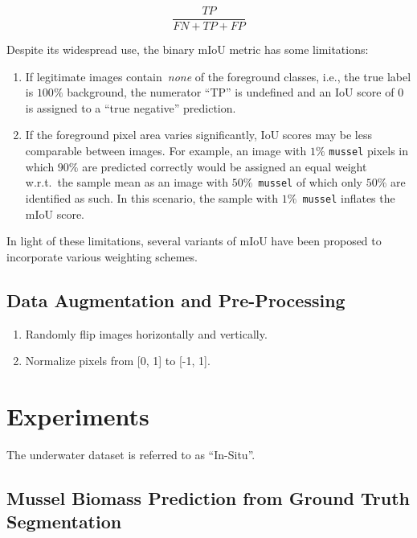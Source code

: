 \documentclass[11pt]{article} %
\begin{document}
\begin{equation}
\frac{TP}{FN + TP + FP}
\end{equation}

Despite its widespread use, the binary mIoU metric has some limitations:

\begin{enumerate}
\item If legitimate images contain~\emph{none} of the foreground classes, i.e.,
the true label is $100\%$ background, the numerator ``TP'' is undefined and an
IoU score of 0 is assigned to a ``true negative'' prediction.

\item If the foreground pixel area varies significantly, IoU 
scores may be less comparable between images. For example, an image with $1\%$
\texttt{mussel} pixels in which $90\%$ are predicted correctly would be assigned
an equal weight w.r.t.~the sample mean as an image with $50\%$~\texttt{mussel}
of which only $50\%$ are identified as such. In this scenario, the sample with
$1\%$~\texttt{mussel} inflates the mIoU score.
\end{enumerate}

In light of these limitations, several variants of mIoU have been proposed to 
incorporate various weighting schemes.

\subsection{Data Augmentation and Pre-Processing}

\begin{enumerate}

\item Randomly flip images horizontally and vertically.

\item Normalize pixels from [0, 1] to [-1, 1].

\end{enumerate}

\section{Experiments}

The underwater dataset is referred to as ``In-Situ''.

\subsection{Mussel Biomass Prediction from Ground Truth Segmentation}
\end{document}
